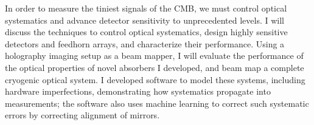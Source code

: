 \documentclass{ucetd}
\begin{document}
In order to measure the tiniest signals of the CMB, we must control optical systematics and advance detector sensitivity to unprecedented levels. I will discuss the techniques to control optical systematics, design highly sensitive detectors and feedhorn arrays, and characterize their performance. Using a holography imaging setup as a beam mapper, I will evaluate the performance of the optical properties of novel absorbers I developed, and beam map a complete cryogenic optical system. I developed software to model these systems,  including hardware imperfections, demonstrating how systematics propagate into measurements; the software also uses machine learning to correct such systematic errors by correcting alignment of mirrors. 


\mainmatter











\appendix







\acknowledgments
\end{document}
